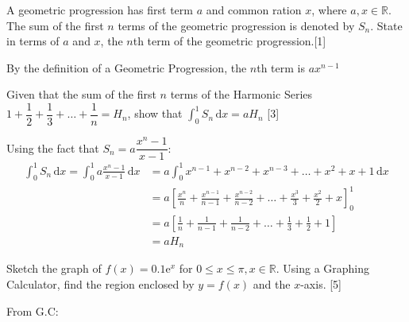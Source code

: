 \documentclass[12pt, a4 paper]{article}
\begin{document}
\begin{outline}[enumerate]
	\1 A geometric progression has first term $a$ and common ration $x$, where $a,x \in \mathbb{R}$. The sum of the first $n$ terms of the geometric progression is denoted by $S_n$.
	\2 State in terms of $a$ and $x$, the $n$th term of the geometric progression.\hfill[1]
	\begin{answer}
		By the definition of a Geometric Progression, the $n$th term is $ax^{n-1}$
	\end{answer}
	\2 Given that the sum of the first $n$ terms of the Harmonic Series $1+\dfrac{1}{2}+\dfrac{1}{3}+\dots+\dfrac{1}{n}=H_n$, show that $\int_0^1 S_n\,\mathrm{d}x=aH_n$ \hfill[3]
	\begin{answer}
		Using the fact that $S_n = a\dfrac{x^n-1}{x-1}$:
		\begin{align*}
			\int_0^1 S_n\,\mathrm{d}x = \int_0^1 a\frac{x^n-1}{x-1}\,\mathrm{d}x & = a\int_0^1 x^{n-1}+x^{n-2}+x^{n-3}+\dots+x^2+x+1\,\mathrm{d}x                                     \\
			                                                                     & = a[\frac{x^n}{n}+\frac{x^{n-1}}{n-1}+\frac{x^{n-2}}{n-2}+\dots+\frac{x^3}{3}+\frac{x^2}{2}+x]_0^1 \\
			                                                                     & = a[\frac{1}{n}+\frac{1}{n-1}+\frac{1}{n-2}+\dots+\frac{1}{3}+\frac{1}{2}+1]                       \\
			                                                                     & = aH_n                                                                                             
		\end{align*}
	\end{answer}
	\1 Sketch the graph of $f(x) = 0.1\mathrm{e}^x$ for $0\leq x \leq \pi, x\in\mathbb{R}$. Using a Graphing Calculator, find the region enclosed by $y=f(x)$ and the $x$-axis. \hfill[5]
	\begin{answer}
		From G.C:
		\begin{equation*}

\end{equation*}
\end{answer}
\end{outline}
\end{document}
